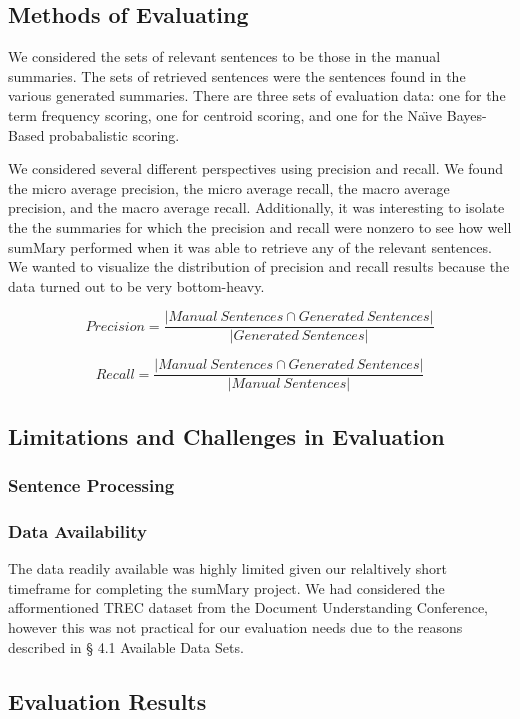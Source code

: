 \documentclass[11pt,a4paper]{article}
\begin{document}
\subsection{Methods of Evaluating}
We considered the sets of relevant sentences to be those in the manual summaries. The sets of retrieved sentences were the sentences found in the various generated summaries. There are three sets of evaluation data: one for the term frequency scoring, one for centroid scoring, and one for the Na{\"\i}ve Bayes-Based probabalistic scoring.

We considered several different perspectives using precision and recall. We found the micro average precision, the micro average recall, the macro average precision, and the macro average recall. Additionally, it was interesting to isolate the the summaries for which the precision and recall were nonzero to see how well sumMary performed when it was able to retrieve any of the relevant sentences. We wanted to visualize the distribution of precision and recall results because the data turned out to be very bottom-heavy.

\begingroup\makeatletter{}\check@mathfonts
$$Precision = \frac{|Manual \: Sentences \cap Generated \: Sentences|}{|Generated \: Sentences|}$$

$$Recall = \frac{|Manual \: Sentences \cap Generated \: Sentences|}{|Manual \: Sentences|}$$
\endgroup

\subsection{Limitations and Challenges in Evaluation}
\subsubsection{Sentence Processing}
\subsubsection{Data Availability}
The data readily available was highly limited given our relaltively short timeframe for completing the sumMary project. We had considered the afformentioned TREC dataset from the Document Understanding Conference, however this was not practical for our evaluation needs due to the reasons described in § 4.1 Available Data Sets. 

\subsection{Evaluation Results}
\end{document}

